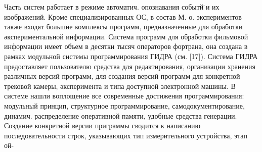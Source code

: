 \documentclass[10pt]{article}
\begin{document}
Часть систем работает в режиме автоматич. опознавания событй̈ и их изображений. Кроме специализированных ОС, в состав М. о. экспериментов также входят большие комплексы программ, предназначенные для обработки әкспериментальной информации. Система программ для обработки фильмовой информации имеет объем в десятки тысяч операторов фортрана, она создана в рамках модульной системы программирования ГИДРА (см. [17]). Система ГИДРА предоставляет пользователю средства для редактирования, организации хранения различных версий программ, для создания версий программ для конкретной трековой камеры, әксперимента и типа доступной электронной машины. В системе нашли воплощение все современные достижения программирования: модульный принцип, структурное программирование, самодокументирование, динамич. распределение оперативной памяти, удобные средства генерации. Создание конкретной версии приграммы сводится к написанию последовательности строк, указывающих тип измерительного устройства, этап ой-
\end{document}
